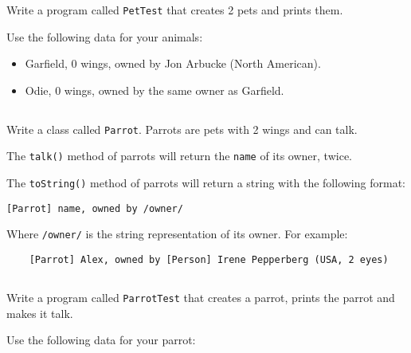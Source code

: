 \documentclass[a4paper, 11pt]{article}
\begin{document}
Write a program called \verb+PetTest+ that creates 2 pets and prints
them.

Use the following data for your animals:

\begin{itemize}

  \item Garfield, 0 wings, owned by Jon Arbucke (North American).

  \item Odie, 0 wings, owned by the same owner as Garfield.

\end{itemize}











\subsection{}

Write a class called \verb+Parrot+. Parrots are pets with 2 wings and can talk.

The \verb+talk()+ method of parrots will return the \verb+name+ of its owner,
twice.

The \verb+toString()+ method of parrots will return a string with the
following format:

\verb+[Parrot] name, owned by /owner/+

Where \verb+/owner/+ is the string representation of its owner. For example:

\verb+    [Parrot] Alex, owned by [Person] Irene Pepperberg (USA, 2 eyes)+



\subsection{}

Write a program called \verb+ParrotTest+ that creates a parrot, prints
the parrot and makes it talk.

Use the following data for your parrot:
\end{document}
